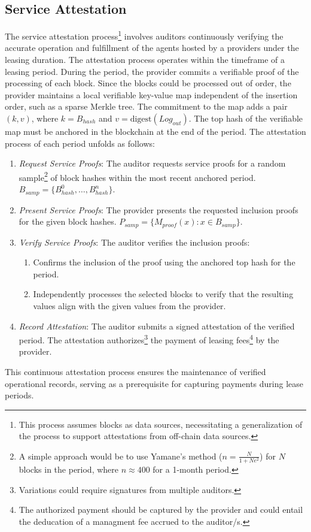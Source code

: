 \documentclass{oc}
\begin{document}
\subsection{Service Attestation}\label{sec:service-attestation}

The service attestation process\footnote{
  This process assumes blocks as data sources, necessitating a generalization of the process to support attestations from off-chain data sources.
} involves \glspl{auditor} continuously verifying the accurate operation and fulfillment of the agents hosted by a \glspl{provider} under the leasing duration.
The attestation process operates within the timeframe of a leasing period.
During the period, the provider commits a verifiable proof of the processing of each block.
Since the blocks could be processed out of order, the \gls{provider} maintains a local verifiable key-value map independent of the insertion order, such as a sparse Merkle tree\cite{cryptoeprint:2016/683}.
The commitment to the map adds a pair $(k, v)$, where $k=B_{hash}$ and $v=\text{digest}(Log_{out})$.
The top hash of the verifiable map must be anchored in the blockchain at the end of the period.
The attestation process of each period unfolds as follows:

\begin{enumerate}
  \item \emph{Request Service Proofs}: The \gls{auditor} requests service proofs for a random sample\footnote{
    A simple approach would be to use Yamane's method ($n=\frac{N}{1+Ne^2}$) for $N$ blocks in the period, where $n\approx400$ for a 1-month period.
  } of block hashes within the most recent anchored period. $B_{samp}=\{B_{hash}^0,\ldots,B_{hash}^n\}$.
  
  \item \emph{Present Service Proofs}: The \gls{provider} presents the requested inclusion proofs for the given block hashes. $P_{samp}=\{M_{proof}(x) : x \in B_{samp}\}$.
  
  \item \emph{Verify Service Proofs}: The \gls{auditor} verifies the inclusion proofs:
    \begin{enumerate}
      \item Confirms the inclusion of the proof using the anchored top hash for the period.
      \item Independently processes the selected blocks to verify that the resulting values align with the given values from the provider.
    \end{enumerate}
  
  \item \emph{Record Attestation}: The \gls{auditor} submits a signed attestation of the verified period. The attestation authorizes\footnote{
    Variations could require signatures from multiple auditors.
  } the payment of leasing fees\footnote{
    The authorized payment should be captured by the \gls{provider} and could entail the deducation of a managment fee accrued to the \gls{auditor}/s.
  } by the \gls{provider}.
\end{enumerate}

This continuous attestation process ensures the maintenance of verified operational records, serving as a prerequisite for capturing payments during lease periods.


\clearpage

\printglossary


\end{document}
